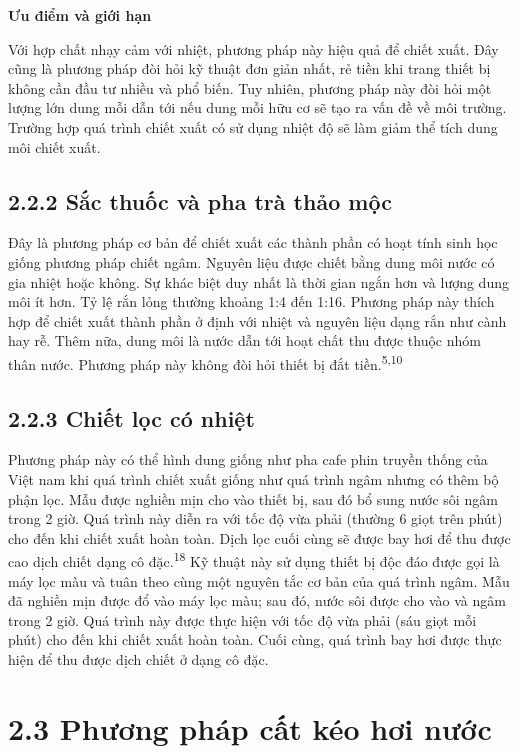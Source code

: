 \documentclass[
  twocolumn,
  landscape]{report}
\begin{document}
\textbf{Ưu điểm và giới hạn}

Với hợp chất nhạy cảm với nhiệt, phương pháp này hiệu quả để chiết xuất.
Đây cũng là phương pháp đòi hỏi kỹ thuật đơn giản nhất, rẻ tiền khi
trang thiết bị không cần đầu tư nhiều và phổ biến. Tuy nhiên, phương
pháp này đòi hỏi một lượng lớn dung mỗi dẫn tới nếu dung mỗi hữu cơ sẽ
tạo ra vấn đề về môi trường. Trường hợp quá trình chiết xuất có sử dụng
nhiệt độ sẽ làm giảm thể tích dung môi chiết xuất.

\subsection{2.2.2 Sắc thuốc và pha trà thảo
mộc}\label{sux1eafc-thuux1ed1c-vuxe0-pha-truxe0-thux1ea3o-mux1ed9c}

Đây là phương pháp cơ bản để chiết xuất các thành phần có hoạt tính sinh
học giống phương pháp chiết ngâm. Nguyên liệu được chiết bằng dung môi
nước có gia nhiệt hoặc không. Sự khác biệt duy nhất là thời gian ngắn
hơn và lượng dung môi ít hơn. Tỷ lệ rắn lỏng thường khoảng 1:4 đến 1:16.
Phương pháp này thích hợp để chiết xuất thành phần ở định với nhiệt và
nguyên liệu dạng rắn như cành hay rễ. Thêm nữa, dung môi là nước dẫn tới
hoạt chất thu được thuộc nhóm thân nước. Phương pháp này không đòi hỏi
thiết bị đắt tiền.\textsuperscript{5,10}

\subsection{2.2.3 Chiết lọc có
nhiệt}\label{chiux1ebft-lux1ecdc-cuxf3-nhiux1ec7t}

Phương pháp này có thể hình dung giống như pha cafe phin truyền thống
của Việt nam khi quá trình chiết xuất giống như quá trình ngâm nhưng có
thêm bộ phận lọc. Mẫu được nghiền mịn cho vào thiết bị, sau đó bổ sung
nước sôi ngâm trong 2 giờ. Quá trình này diễn ra với tốc độ vừa phải
(thường 6 giọt trên phút) cho đến khi chiết xuất hoàn toàn. Dịch lọc
cuối cùng sẽ được bay hơi để thu được cao dịch chiết dạng cô
đặc.\textsuperscript{18} Kỹ thuật này sử dụng thiết bị độc đáo được gọi
là máy lọc màu và tuân theo cùng một nguyên tắc cơ bản của quá trình
ngâm. Mẫu đã nghiền mịn được đổ vào máy lọc màu; sau đó, nước sôi được
cho vào và ngâm trong 2 giờ. Quá trình này được thực hiện với tốc độ vừa
phải (sáu giọt mỗi phút) cho đến khi chiết xuất hoàn toàn. Cuối cùng,
quá trình bay hơi được thực hiện để thu được dịch chiết ở dạng cô đặc.

\section{2.3 Phương pháp cất kéo hơi
nước}\label{phux1b0ux1a1ng-phuxe1p-cux1ea5t-kuxe9o-hux1a1i-nux1b0ux1edbc}
\end{document}
